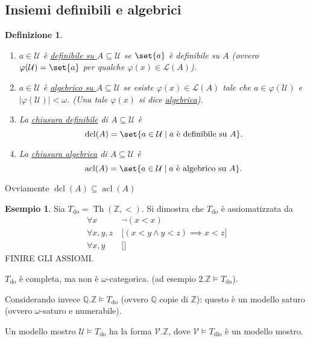 \documentclass[10pt]{article}
\newcommand{\card}[1]{\left\vert #1 \right\vert}
\newcommand{\1}{\mathds{1}}
\newcommand{\Q}{\mathds{Q}}
\newcommand{\Z}{\mathds{Z}}
\theoremstyle{definition}%
\newtheorem{esempio}[thm]{Esempio}
\theoremstyle{plain}
\newtheorem{definizione}[thm]{Definizione}
\theoremstyle{remark}
\begin{document}
\subsection{Insiemi definibili e algebrici}
\label{sec:org8aceb7c}

\begin{definizione}
\begin{enumerate}
\item \(a \in \mathcal{U}\) è \uline{definibile su \(A \subseteq\mathcal{U}\)} se \(\set{a}\) è definibile su \(A\) (ovvero \(\varphi(\mathcal{U})=\set{a}\) per qualche \(\varphi(x) \in \mathcal{L}(A)\)).
\item \(a \in \mathcal{U}\) è \uline{algebrico su \(A \subseteq \mathcal{U}\)} se esiste \(\varphi(x) \in \mathcal{L}(A)\) tale che \(a \in \varphi(\mathcal{U})\) e \(\card{\varphi(\mathcal{U})}<\omega\). (Una tale \(\varphi(x)\) si dice \uline{algebrica}).
\item La \uline{chiusura definibile} di \(A \subseteq \mathcal{U}\) è
\begin{equation*}
 \operatorname{dcl}(A) = \set{a \in \mathcal{U}\mid a\text{ è definibile su }A}.
\end{equation*}
\item La \uline{chiusura algebrica} di \(A \subseteq \mathcal{U}\) è
\begin{equation*}
 \operatorname{acl}(A) = \set{a \in \mathcal{U}\mid a\text{ è algebrico su }A}.
\end{equation*}
\end{enumerate}
\end{definizione}

Ovviamente \(\operatorname{dcl}(A) \subseteq \operatorname{acl}(A)\)

\begin{esempio}
Sia \(T_{\text{do}} =\operatorname{Th}(\Z,<)\). Si dimostra che \(T_{\text{do}}\) è assiomatizzata da
\begin{align*}
\forall x\ &\lnot(x<x)\\
\forall x,y,z\ &\big[(x<y \land y<z)\implies x<z\big]\\
\forall x,y\ &\big[\big]
\end{align*}
FINIRE GLI ASSIOMI.

\(T_{\text{do}}\) è completa, ma non è \(\omega\)-categorica. (ad esempio \(2.\Z\vDash T_{\text{do}}\)).

Considerando invece \(\Q.\Z\vDash T_{\text{do}}\) (ovvero \(\Q\) copie di \(\Z\)): questo è un modello saturo (ovvero \(\omega\)-saturo e numerabile).

Un modello mostro \(\mathcal{U}\vDash T_{\text{do}}\) ha la forma \(\mathcal{V}.\Z\), dove \(\mathcal{V}\vDash T_{\text{dlo}}\) è un modello mostro.
\end{esempio}
\end{document}
